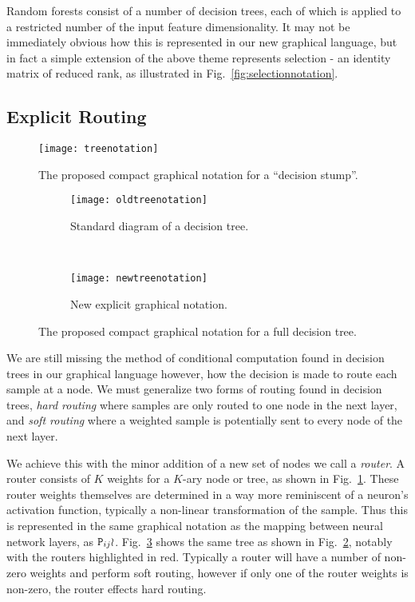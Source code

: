 \documentclass[thesis]{subfiles}
\begin{document}
Random forests consist of a number of decision trees, each of which is applied to a restricted number of the input feature dimensionality. It may not be immediately obvious how this is represented in our new graphical language, but in fact a simple extension of the above theme represents selection - \ie an identity matrix of reduced rank, as illustrated in Fig.~\ref{fig:selectionnotation}.

\subsection{Explicit Routing}
\begin{figure}[htbp!] 
\centering
\texttt{[image: treenotation]}
\caption{The proposed compact graphical notation for a ``decision stump''.}
\label{fig:treeNotation}
\end{figure}

\begin{figure}[htbp!] 
\centering
\begin{subfigure}[b]{0.4\textwidth}
   \centering
   \texttt{[image: oldtreenotation]}
   \caption{Standard diagram of a decision tree.}
   \label{fig:oldtreenotation}
\end{subfigure}
~
\begin{subfigure}[b]{0.4\textwidth}
   \centering
   \texttt{[image: newtreenotation]}
   \caption{New explicit graphical notation.}
   \label{fig:newtreenotation}
\end{subfigure}
\caption{The proposed compact graphical notation for a full decision tree.}
\label{fig:complexDecisionTree}
\end{figure}

We are still missing the method of conditional computation found in decision trees in our graphical language however, \ie how the decision is made to route each sample at a node. We must generalize two forms of routing found in decision trees, \emph{hard routing} where samples are only routed to one node in the next layer, and \emph{soft routing} where a weighted sample is potentially sent to every node of the next layer.

We achieve this with the minor addition of a new set of nodes we call a \emph{router}. A router consists of $K$ weights for a $K$-ary node or tree, as shown in Fig.~\ref{fig:treeNotation}. These router weights themselves are determined in a way more reminiscent of a neuron's activation function, typically a non-linear transformation of the sample. Thus this is represented in the same graphical notation as the mapping between neural network layers, \ie as $\mat P_{ij} \wr$. Fig.~\ref{fig:newtreenotation} shows the same tree as shown in Fig.~\ref{fig:oldtreenotation}, notably with the routers highlighted in red. Typically a router will have a number of non-zero weights and perform soft routing, however if only one of the router weights is non-zero, the router effects hard routing.
\end{document}
